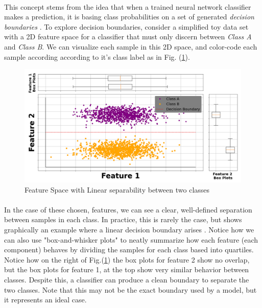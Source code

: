 \documentclass[12pt,letterpaper]{article}
\begin{document}
\paragraph*{}This concept stems from the idea that when a trained neural network classifier makes a prediction, it is basing class probabilities on a set of generated \textit{decision boundaries} \cite{Geron,James}. To explore decision boundaries, consider a simplified toy data set with a 2D feature space for a classifier that must only discern between \textit{Class A} and \textit{Class B}. We can visualize each sample in this 2D space, and color-code each sample according according to it's class label as in Fig. (\ref{fig-LinSep1}).

\begin{figure}[H]
\begin{center}
\includegraphics[scale=0.35]{../MakeFigures/LinearSeparable1}
\end{center}
\caption{Feature Space with Linear separability between two classes}
\label{fig-LinSep1}
\end{figure} 

\paragraph*{}In the case of these chosen, features, we can see a clear, well-defined separation between samples in each class. In practice, this is rarely the case, but shows graphically an example where a linear decision boundary arises \cite{James}. Notice how we can also use "box-and-whisker plots" to neatly summarize how each feature (each component) behaves by dividing the samples for each class based into quartiles. Notice how on the right of Fig.(\ref{fig-LinSep1}) the box plots for feature 2 show no overlap, but the box plots for feature 1, at the top show very similar behavior between classes. Despite this, a classifier can produce a clean boundary to separate the two classes. Note that this may not be the exact boundary used by a model, but it represents an ideal case.
\end{document}
